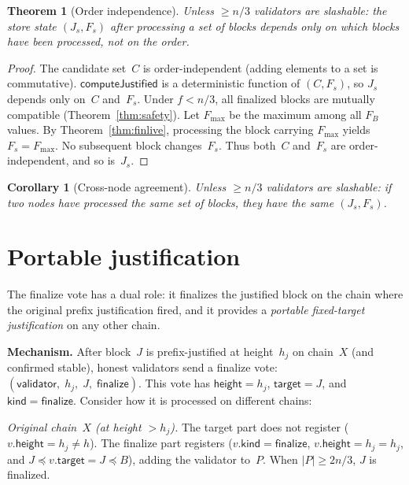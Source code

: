 \ifx\litemode\undefined\documentclass{article}\fi
\renewcommand{\paragraph}[1]{\vspace{7pt}\noindent\textbf{#1}}
\newcommand{\target}{\mathsf{target}}
\newcommand{\kind}{\mathsf{kind}}
\newcommand{\height}{\mathsf{height}}
\newcommand{\finalize}{\mathsf{finalize}}
\newcommand{\validator}{\mathsf{validator}}
\theoremstyle{plain}
\newtheorem{theorem}{Theorem}
\newtheorem{corollary}{Corollary}
\theoremstyle{definition}
\theoremstyle{remark}
\begin{document}
\begin{theorem}[Order independence]\label{thm:orderindep}
Unless $\geq n/3$ validators are slashable: the store state $(J_s, F_s)$ after processing a set of blocks depends only on \emph{which} blocks have been processed, not on the order.
\end{theorem}

\begin{proof}
The candidate set~$C$ is order-independent (adding elements to a set is commutative).
$\textsf{computeJustified}$ is a deterministic function of $(C, F_s)$, so $J_s$ depends only on~$C$ and~$F_s$.
Under $f < n/3$, all finalized blocks are mutually compatible (Theorem~\ref{thm:safety}).
Let $F_{\max}$ be the maximum among all $F_B$ values.
By Theorem~\ref{thm:finlive}, processing the block carrying $F_{\max}$ yields $F_s = F_{\max}$.
No subsequent block changes~$F_s$.
Thus both~$C$ and~$F_s$ are order-independent, and so is~$J_s$.
\end{proof}

\begin{corollary}[Cross-node agreement]\label{cor:agreement}
Unless $\geq n/3$ validators are slashable: if two nodes have processed the same set of blocks, they have the same $(J_s, F_s)$.
\end{corollary}


\section{Portable justification}\label{sec:portable}

The finalize vote has a dual role: it finalizes the justified block on the chain where the original prefix justification fired, and it provides a \emph{portable fixed-target justification} on any other chain.

\paragraph{Mechanism.}
After block~$J$ is prefix-justified at height~$h_j$ on chain~$X$ (and confirmed stable), honest validators send a finalize vote: $(\validator,\; h_j,\; J,\; \finalize)$.
This vote has $\height = h_j$, $\target = J$, and $\kind = \finalize$.
Consider how it is processed on different chains:

\emph{Original chain~$X$ (at height $> h_j$).}
The target part does not register ($v.\height = h_j \neq h$).
The finalize part registers ($v.\kind = \finalize$, $v.\height = h_j = h_j$, and $J \preceq v.\target = J \preceq B$), adding the validator to~$P$.
When $|P| \geq 2n/3$, $J$ is finalized.
\end{document}
